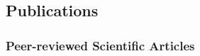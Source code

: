 \documentclass{article}
\begin{document}


\subsection{Publications}
\subsubsection{Peer-reviewed Scientific Articles}
\end{document}
